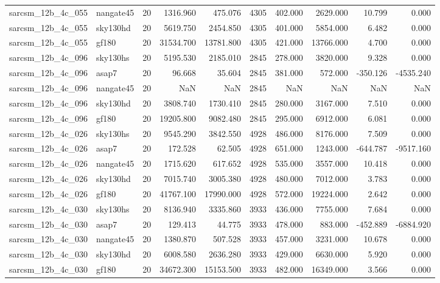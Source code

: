 \documentclass{article}
\begin{document}
\begin{longtable}{llrrrrrrrr}
sarcsm\_12b\_4c\_055 & nangate45 & 20 & 1316.960 & 475.076 & 4305 & 402.000 & 2629.000 & 10.799 & 0.000 \\
sarcsm\_12b\_4c\_055 & sky130hd & 20 & 5619.750 & 2454.850 & 4305 & 401.000 & 5854.000 & 6.482 & 0.000 \\
sarcsm\_12b\_4c\_055 & gf180 & 20 & 31534.700 & 13781.800 & 4305 & 421.000 & 13766.000 & 4.700 & 0.000 \\
sarcsm\_12b\_4c\_096 & sky130hs & 20 & 5195.530 & 2185.010 & 2845 & 278.000 & 3820.000 & 9.328 & 0.000 \\
sarcsm\_12b\_4c\_096 & asap7 & 20 & 96.668 & 35.604 & 2845 & 381.000 & 572.000 & -350.126 & -4535.240 \\
sarcsm\_12b\_4c\_096 & nangate45 & 20 & NaN & NaN & 2845 & NaN & NaN & NaN & NaN \\
sarcsm\_12b\_4c\_096 & sky130hd & 20 & 3808.740 & 1730.410 & 2845 & 280.000 & 3167.000 & 7.510 & 0.000 \\
sarcsm\_12b\_4c\_096 & gf180 & 20 & 19205.800 & 9082.480 & 2845 & 295.000 & 6912.000 & 6.081 & 0.000 \\
sarcsm\_12b\_4c\_026 & sky130hs & 20 & 9545.290 & 3842.550 & 4928 & 486.000 & 8176.000 & 7.509 & 0.000 \\
sarcsm\_12b\_4c\_026 & asap7 & 20 & 172.528 & 62.505 & 4928 & 651.000 & 1243.000 & -644.787 & -9517.160 \\
sarcsm\_12b\_4c\_026 & nangate45 & 20 & 1715.620 & 617.652 & 4928 & 535.000 & 3557.000 & 10.418 & 0.000 \\
sarcsm\_12b\_4c\_026 & sky130hd & 20 & 7015.740 & 3005.380 & 4928 & 480.000 & 7012.000 & 3.783 & 0.000 \\
sarcsm\_12b\_4c\_026 & gf180 & 20 & 41767.100 & 17990.000 & 4928 & 572.000 & 19224.000 & 2.642 & 0.000 \\
sarcsm\_12b\_4c\_030 & sky130hs & 20 & 8136.940 & 3335.860 & 3933 & 436.000 & 7755.000 & 7.684 & 0.000 \\
sarcsm\_12b\_4c\_030 & asap7 & 20 & 129.413 & 44.775 & 3933 & 478.000 & 883.000 & -452.889 & -6884.920 \\
sarcsm\_12b\_4c\_030 & nangate45 & 20 & 1380.870 & 507.528 & 3933 & 457.000 & 3231.000 & 10.678 & 0.000 \\
sarcsm\_12b\_4c\_030 & sky130hd & 20 & 6008.580 & 2636.280 & 3933 & 429.000 & 6630.000 & 5.920 & 0.000 \\
sarcsm\_12b\_4c\_030 & gf180 & 20 & 34672.300 & 15153.500 & 3933 & 482.000 & 16349.000 & 3.566 & 0.000 \\

\end{longtable}
\end{document}
